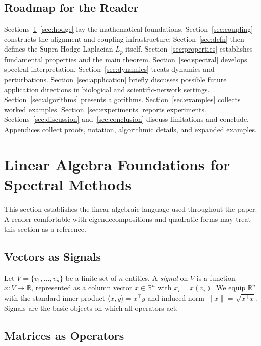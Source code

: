 \documentclass[11pt]{article}
\theoremstyle{definition}
\theoremstyle{remark}
\newcommand{\R}{\mathbb{R}}
\begin{document}
\subsection{Roadmap for the Reader}

Sections~\ref{sec:linalg}--\ref{sec:hodge} lay the mathematical foundations.
Section~\ref{sec:coupling} constructs the alignment and coupling infrastructure;
Section~\ref{sec:defn} then defines the Supra-Hodge Laplacian $L_p$ itself.
Section~\ref{sec:properties} establishes fundamental properties and the main
theorem. Section~\ref{sec:spectral} develops spectral interpretation.
Section~\ref{sec:dynamics} treats dynamics and perturbations.
Section~\ref{sec:application} briefly discusses possible future application directions in biological and scientific-network settings.
Section~\ref{sec:algorithms} presents algorithms. Section~\ref{sec:examples}
collects worked examples. Section~\ref{sec:experiments} reports experiments.
Sections~\ref{sec:discussion} and~\ref{sec:conclusion} discuss limitations and
conclude. Appendices collect proofs, notation, algorithmic details, and expanded
examples.


\section{Linear Algebra Foundations for Spectral Methods}
\label{sec:linalg}

This section establishes the linear-algebraic language used throughout the
paper. A reader comfortable with eigendecompositions and quadratic forms may
treat this section as a reference.

\subsection{Vectors as Signals}

Let $V = \{v_1,\dots,v_n\}$ be a finite set of $n$ entities. A \emph{signal}
on $V$ is a function $x\colon V \to \R$, represented as a column vector
$x \in \R^n$ with $x_i = x(v_i)$. We equip $\R^n$ with the standard inner
product $\langle x, y\rangle = x^\top y$ and induced norm $\|x\| =
\sqrt{x^\top x}$. Signals are the basic objects on which all operators act.

\subsection{Matrices as Operators}
\end{document}
